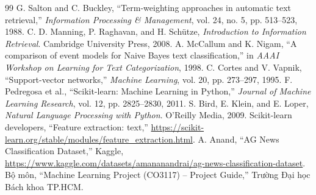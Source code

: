 \documentclass[12pt]{hcmut-report}
\begin{document}
\clearpage
\renewcommand{\refname}{Tài liệu tham khảo}
\begin{thebibliography}{99}
   G. Salton and C. Buckley, ``Term-weighting approaches in automatic text retrieval,'' \textit{Information Processing \& Management}, vol. 24, no. 5, pp. 513--523, 1988.
   C. D. Manning, P. Raghavan, and H. Schütze, \textit{Introduction to Information Retrieval}. Cambridge University Press, 2008.
   A. McCallum and K. Nigam, ``A comparison of event models for Naive Bayes text classification,'' in \textit{AAAI Workshop on Learning for Text Categorization}, 1998.
   C. Cortes and V. Vapnik, ``Support-vector networks,'' \textit{Machine Learning}, vol. 20, pp. 273--297, 1995.
   F. Pedregosa et al., ``Scikit-learn: Machine Learning in Python,'' \textit{Journal of Machine Learning Research}, vol. 12, pp. 2825--2830, 2011.
   S. Bird, E. Klein, and E. Loper, \textit{Natural Language Processing with Python}. O'Reilly Media, 2009.
   Scikit-learn developers, ``Feature extraction: text,'' \url{https://scikit-learn.org/stable/modules/feature_extraction.html}.
   A. Anand, ``AG News Classification Dataset,'' Kaggle, \url{https://www.kaggle.com/datasets/amananandrai/ag-news-classification-dataset}.
   Bộ môn, ``Machine Learning Project (CO3117) -- Project Guide,'' Trường Đại học Bách khoa TP.HCM.
\end{thebibliography}
\end{document}
